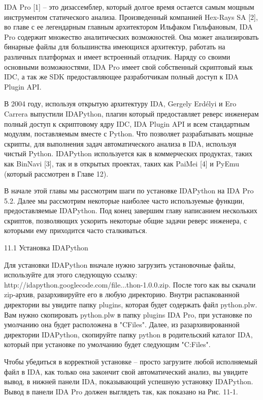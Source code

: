 \documentclass[12pt, a4paper, oneside]{book}
\begin{document}
IDA Pro [1] – это дизассемблер, который долгое время остается самым мощным инструментом статического анализа. Произведенный компанией Hex-Rays SA [2], во главе с ее легендарным главным архитектором Ильфаком Гильфановым, IDA Pro содержит множество аналитических возможностей. Она может анализировать бинарные файлы для большинства имеющихся архитектур, работать на различных платформах и имеет встроенный отладчик. Наряду со своими основными возможностями, IDA Pro имеет свой собственный скриптовый язык IDC, а так же SDK предоставляющее разработчикам полный доступ к IDA Plugin API.

В 2004 году, используя открытую архитектуру IDA, Gergely Erdélyi и Ero Carrera выпустили IDAPython, плагин который предоставляет реверс инженерам полный доступ к скриптовому ядру IDC, IDA Plugin API и всем стандартным модулям, поставляемым вместе с Python. Что позволяет разрабатывать мощные скрипты, для выполнения задач автоматического анализа в IDA, используя чистый Python. IDAPython используется как в коммерческих продуктах, таких как BinNavi [3], так и в открытых проектах, таких как PaiMei [4] и PyEmu (который рассмотрен в Главе 12).

В начале этой главы мы рассмотрим шаги по установке IDAPython на IDA Pro 5.2. Далее мы рассмотрим некоторые наиболее часто используемые функции, предоставляемые IDAPython. Под конец завершим главу написанием нескольких скриптов, позволяющих ускорить некоторые общие задачи реверс инженера, с которыми ему приходится часто сталкиваться. 


11.1 Установка IDAPython

Для установки IDAPython вначале нужно загрузить установочные файлы, используйте для этого следующую ссылку:
http://idapython.googlecode.com/file...thon-1.0.0.zip.
После того как вы скачали zip-архив, разархивируйте его в любую директорию. Внутри распакованной директории вы увидите папку plugins, которая будет содержать файл python.plw. Вам нужно скопировать python.plw в папку plugins IDA Pro, при установке по умолчанию она будет расположена в "C\Program Files\IDA\plugins". Далее, из разархивированной директории IDAPython, скопируйте папку python в родительский каталог IDA, который при установке по умолчанию будет следующим "C:\Program Files\IDA". 

Чтобы убедиться в корректной установке – просто загрузите любой исполняемый файл в IDA, как только она закончит свой автоматический анализ, вы увидите вывод, в нижней панели IDA, показывающий успешную установку IDAPython. Вывод в панели IDA Pro должен выглядеть так, как показано на Рис. 11-1.
\end{document}
